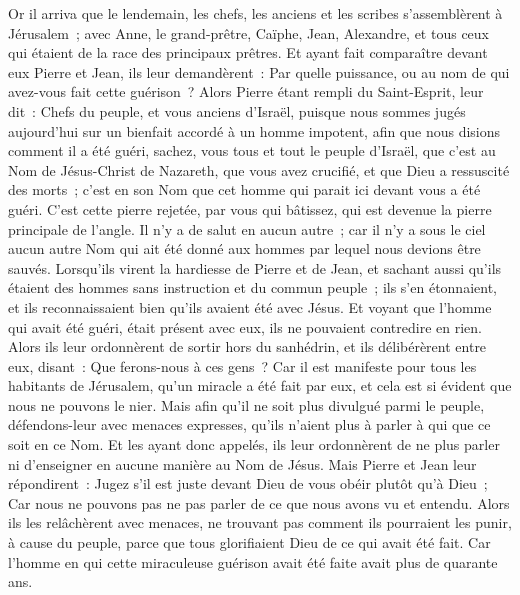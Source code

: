 \begin{multicols}{2}
Or il arriva que le lendemain, les chefs, les anciens et les scribes s'assemblèrent à Jérusalem~;
avec Anne, le grand-prêtre, Caïphe, Jean, Alexandre, et tous ceux qui étaient de la race des principaux prêtres.
Et ayant fait comparaître devant eux Pierre et Jean, ils leur demandèrent~: Par quelle puissance, ou au nom de qui avez-vous fait cette guérison~?
Alors Pierre étant rempli du Saint-Esprit, leur dit~: Chefs du peuple, et vous anciens d'Israël,
puisque nous sommes jugés aujourd'hui sur un bienfait accordé à un homme impotent, afin que nous disions comment il a été guéri,
sachez, vous tous et tout le peuple d'Israël, que c'est au Nom de Jésus-Christ de Nazareth, que vous avez crucifié, et que Dieu a ressuscité des morts~; c'est en son Nom que cet homme qui parait ici devant vous a été guéri.
C'est cette pierre rejetée, par vous qui bâtissez, qui est devenue la pierre principale de l'angle.
Il n'y a de salut en aucun autre~; car il n'y a sous le ciel aucun autre Nom qui ait été donné aux hommes par lequel nous devions être sauvés.
Lorsqu'ils virent la hardiesse de Pierre et de Jean, et sachant aussi qu'ils étaient des hommes sans instruction et du commun peuple~; ils s'en étonnaient, et ils reconnaissaient bien qu'ils avaient été avec Jésus.
Et voyant que l'homme qui avait été guéri, était présent avec eux, ils ne pouvaient contredire en rien.
Alors ils leur ordonnèrent de sortir hors du sanhédrin, et ils délibérèrent entre eux, disant~: Que ferons-nous à ces gens~?
Car il est manifeste pour tous les habitants de Jérusalem, qu'un miracle a été fait par eux, et cela est si évident que nous ne pouvons le nier.
Mais afin qu'il ne soit plus divulgué parmi le peuple, défendons-leur avec menaces expresses, qu'ils n'aient plus à parler à qui que ce soit en ce Nom.
Et les ayant donc appelés, ils leur ordonnèrent de ne plus parler ni d'enseigner en aucune manière au Nom de Jésus.
Mais Pierre et Jean leur répondirent~: Jugez s'il est juste devant Dieu de vous obéir plutôt qu'à Dieu~;
Car nous ne pouvons pas ne pas parler de ce que nous avons vu et entendu.
Alors ils les relâchèrent avec menaces, ne trouvant pas comment ils pourraient les punir, à cause du peuple, parce que tous glorifiaient Dieu de ce qui avait été fait.
Car l'homme en qui cette miraculeuse guérison avait été faite avait plus de quarante ans.

\end{multicols}
